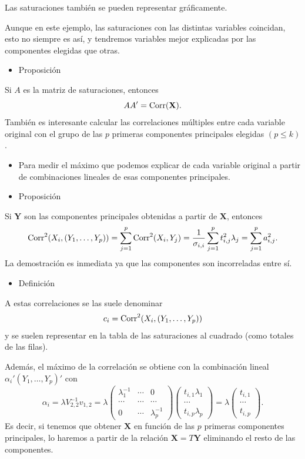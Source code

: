 Las saturaciones también se pueden representar gráficamente.

Aunque en este ejemplo, las saturaciones con las distintas variables coincidan, esto no siempre es así, y tendremos variables mejor explicadas por las componentes elegidas que otras.
\begin{itemize}[label=\color{red}\textbullet, leftmargin=*]
	\item \color{lightblue}Proposición
\end{itemize}
Si $A$ es la matriz de saturaciones, entonces \[ AA'=\operatorname{Corr}(\mathbf{X}). \]
También es interesante calcular las correlaciones múltiples entre cada variable original con el grupo de las $p$ primeras componentes principales elegidas $(p\le k)$.
\begin{itemize}
	\item Para medir el máximo que podemos explicar de cada variable original a partir de combinaciones lineales de esas componentes principales.
\end{itemize}
\begin{itemize}[label=\color{red}\textbullet, leftmargin=*]
	\item \color{lightblue}Proposición
\end{itemize}
Si $\mathbf{Y}$ son las componentes principales obtenidas a partir de $\mathbf{X}$, entonces \[ \operatorname{Corr}^2(X_i,(Y_1,\dots,Y_p))=\sum_{j=1}^{p}\operatorname{Corr}^2(X_i,Y_j)=\dfrac{1}{\sigma_{i,i}}\sum_{j=1}^{p}t_{i,j}^2\lambda_j=\sum_{j=1}^{p}a_{i,j}^2. \]
La demostración es inmediata ya que las componentes son incorreladas entre sí.
\begin{itemize}[label=\color{red}\textbullet, leftmargin=*]
	\item \color{lightblue}Definición
\end{itemize}
A estas correlaciones se las suele denominar  \[ c_i=\operatorname{Corr}^2(X_i,(Y_1,\dots,Y_p)) \]y se suelen representar en la tabla de las saturaciones al cuadrado (como totales de las filas).

Además, el máximo de la correlación se obtiene con la combinación lineal $\alpha_i'(Y_1,\dots,Y_p)'$ con \[ \alpha_i=\lambda V_{2,2}^{-1}v_{1,2}=\lambda\begin{pmatrix}
	\lambda_1^{-1} & \cdots & 0\\
	\cdots & \cdots & \cdots\\
	0 & \cdots & \lambda_p^{-1}
\end{pmatrix}\begin{pmatrix}
t_{i,1}\lambda_1\\
\cdots\\
t_{i,p}\lambda_p
\end{pmatrix}=\lambda\begin{pmatrix}
t_{i,1}\\
\cdots\\
t_{i,p}
\end{pmatrix}. \]
Es decir, si tenemos que obtener $\mathbf{X}$ en función de las $p$ primeras componentes principales, lo haremos a partir de la relación $\mathbf{X}=T\mathbf{Y}$ eliminando el resto de las componentes.

